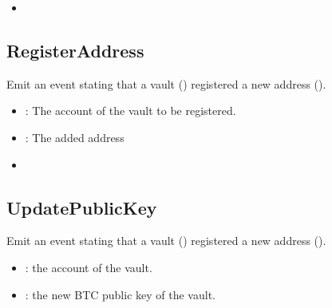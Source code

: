 \documentclass[a4paper,10pt,english]{sphinxmanual}
\begin{document}
\begin{itemize}
\item {} 
{\hyperref[\detokenize{spec/vault-registry:withdrawcollateral}]{}}

\end{itemize}


\subsection{RegisterAddress}
\label{\detokenize{spec/vault-registry:id42}}
Emit an event stating that a vault () registered a new address ().



\begin{itemize}
\item {} 
: The account of the vault to be registered.

\item {} 
: The added address

\end{itemize}

\begin{itemize}
\item {} 
{\hyperref[\detokenize{spec/vault-registry:registeraddress}]{}}

\end{itemize}


\subsection{UpdatePublicKey}
\label{\detokenize{spec/vault-registry:id43}}
Emit an event stating that a vault () registered a new address ().



\begin{itemize}
\item {} 
: the account of the vault.

\item {} 
: the new BTC public key of the vault.

\end{itemize}
\end{document}
